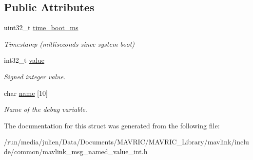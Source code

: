 \subsection*{Public Attributes}
\begin{DoxyCompactItemize}
\item 
\hypertarget{struct____mavlink__named__value__int__t_ab9e1d97f4b6a53bac6086743223c4249}{uint32\+\_\+t \hyperlink{struct____mavlink__named__value__int__t_ab9e1d97f4b6a53bac6086743223c4249}{time\+\_\+boot\+\_\+ms}}\label{struct____mavlink__named__value__int__t_ab9e1d97f4b6a53bac6086743223c4249}

\begin{DoxyCompactList}\small\item\em Timestamp (milliseconds since system boot) \end{DoxyCompactList}\item 
\hypertarget{struct____mavlink__named__value__int__t_ab6bdae0f70ba0c8bece0d206c0075fef}{int32\+\_\+t \hyperlink{struct____mavlink__named__value__int__t_ab6bdae0f70ba0c8bece0d206c0075fef}{value}}\label{struct____mavlink__named__value__int__t_ab6bdae0f70ba0c8bece0d206c0075fef}

\begin{DoxyCompactList}\small\item\em Signed integer value. \end{DoxyCompactList}\item 
\hypertarget{struct____mavlink__named__value__int__t_a3816d3a8c6130f7f9657d833ad39a202}{char \hyperlink{struct____mavlink__named__value__int__t_a3816d3a8c6130f7f9657d833ad39a202}{name} \mbox{[}10\mbox{]}}\label{struct____mavlink__named__value__int__t_a3816d3a8c6130f7f9657d833ad39a202}

\begin{DoxyCompactList}\small\item\em Name of the debug variable. \end{DoxyCompactList}\end{DoxyCompactItemize}


The documentation for this struct was generated from the following file\+:\begin{DoxyCompactItemize}
\item 
/run/media/julien/\+Data/\+Documents/\+M\+A\+V\+R\+I\+C/\+M\+A\+V\+R\+I\+C\+\_\+\+Library/mavlink/include/common/mavlink\+\_\+msg\+\_\+named\+\_\+value\+\_\+int.\+h\end{DoxyCompactItemize}
